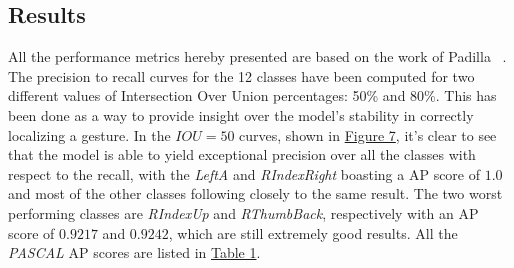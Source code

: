 \documentclass[10pt,twocolumn,letterpaper]{article}
\begin{document}
\subsection{Results}
\begin{flushleft}
All the performance metrics hereby presented are based on the work of Padilla \etal~\cite{electronics10030279}.\linebreak
The precision to recall curves for the 12 classes have been computed for two different values of Intersection Over Union percentages: 50\% and 80\%. This has been done as a way to provide insight over the model's stability in correctly localizing a gesture.\linebreak
In the $IOU=50$ curves, shown in \hyperref[figure7]{Figure 7}, it's clear to see that the model is able to yield exceptional precision over all the classes with respect to the recall, with the \textit{LeftA} and \textit{RIndexRight} boasting a AP score of $1.0$ and most of the other classes following closely to the same result. The two worst performing classes are \textit{RIndexUp} and \textit{RThumbBack}, respectively with an AP score of $0.9217$ and $0.9242$, which are still extremely good results. All the \textit{PASCAL} AP scores are listed in \hyperref[table1]{Table 1}.


\end{flushleft}
\end{document}
